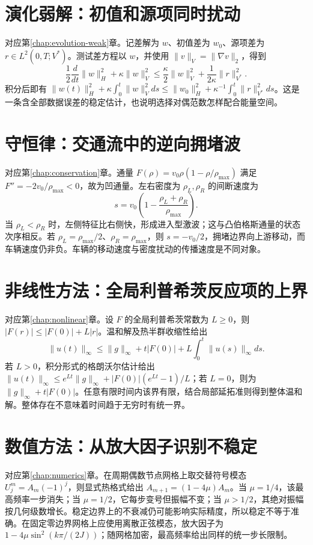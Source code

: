 \documentclass[UTF8,12pt,a4paper,fontset=fandol]{ctexbook}
\begin{document}
\section{演化弱解：初值和源项同时扰动}
对应第\ref{chap:evolution-weak}章。记差解为 $w$、初值差为 $w_0$、源项差为 $r\in L^2(0,T;V^*)$。测试差方程以 $w$，并使用 $\|v\|_V=\|\nabla v\|_2$，得到
\[
 \frac12\frac d{dt}\|w\|_H^2+\kappa\|w\|_V^2
 \le\frac\kappa2\|w\|_V^2+\frac1{2\kappa}\|r\|_{V^*}^2.
\]
积分后即有 $\|w(t)\|_H^2+\kappa\int_0^t\|w\|_V^2ds\le\|w_0\|_H^2+\kappa^{-1}\int_0^t\|r\|_{V^*}^2ds$。这是一条含全部数据误差的稳定估计，也说明选择对偶范数怎样配合能量空间。

\section{守恒律：交通流中的逆向拥堵波}
对应第\ref{chap:conservation}章。通量 $F(\rho)=v_0\rho(1-\rho/\rho_{\max})$ 满足 $F''=-2v_0/\rho_{\max}<0$，故为凹通量。左右密度为 $\rho_L,\rho_R$ 的间断速度为
\[
 s=v_0\left(1-\frac{\rho_L+\rho_R}{\rho_{\max}}\right).
\]
当 $\rho_L<\rho_R$ 时，左侧特征比右侧快，形成进入型激波；这与凸伯格斯通量的状态次序相反。若 $\rho_L=\rho_{\max}/2$、$\rho_R=\rho_{\max}$，则 $s=-v_0/2$，拥堵边界向上游移动，而车辆速度仍非负。车辆的移动速度与密度扰动的传播速度是不同对象。

\section{非线性方法：全局利普希茨反应项的上界}
对应第\ref{chap:nonlinear}章。设 $F$ 的全局利普希茨常数为 $L\ge0$，则 $|F(r)|\le|F(0)|+L|r|$。温和解及热半群收缩性给出
\[
 \|u(t)\|_\infty\le\|g\|_\infty+t|F(0)|
       +L\int_0^t\|u(s)\|_\infty ds.
\]
若 $L>0$，积分形式的格朗沃尔估计给出 $\|u(t)\|_\infty\le e^{Lt}\|g\|_\infty+|F(0)|(e^{Lt}-1)/L$；若 $L=0$，则为 $\|g\|_\infty+t|F(0)|$。任意有限时间内该界有限，结合局部延拓准则得到整体温和解。整体存在不意味着时间趋于无穷时有统一界。

\section{数值方法：从放大因子识别不稳定}
对应第\ref{chap:numerics}章。在周期偶数节点网格上取交替符号模态 $U_j^m=A_m(-1)^j$，则显式热格式给出 $A_{m+1}=(1-4\mu)A_m$。当 $\mu=1/4$，该最高频率一步消失；当 $\mu=1/2$，它每步变号但振幅不变；当 $\mu>1/2$，其绝对振幅按几何级数增长。稳定边界上的不衰减仍可能影响实际精度，所以稳定不等于准确。在固定零边界网格上应使用离散正弦模态，放大因子为 $1-4\mu\sin^2(k\pi/(2J))$；随网格加密，最高频率给出同样的统一步长限制。
\end{document}
